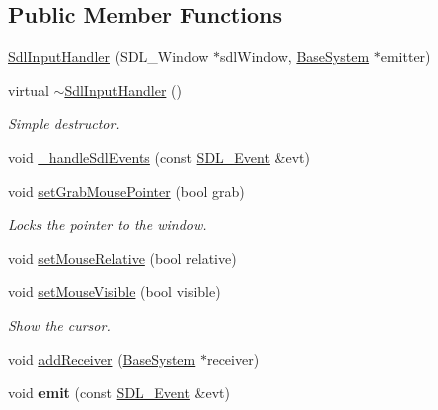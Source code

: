 \subsection*{Public Member Functions}
\begin{DoxyCompactItemize}
\item 
\hyperlink{class_common_1_1_sdl_input_handler_ac90801d445e5c31dcd2b965ca3eaef53}{Sdl\+Input\+Handler} (S\+D\+L\+\_\+\+Window $\ast$sdl\+Window, \hyperlink{class_common_1_1_base_system}{Base\+System} $\ast$emitter)
\item 
\mbox{\label{class_common_1_1_sdl_input_handler_aee86cff741e688efe72e66e947592fed}} 
virtual \hyperlink{class_common_1_1_sdl_input_handler_aee86cff741e688efe72e66e947592fed}{$\sim$\+Sdl\+Input\+Handler} ()
\begin{DoxyCompactList}\small\item\em Simple destructor. \end{DoxyCompactList}\item 
void \hyperlink{class_common_1_1_sdl_input_handler_a24ecda74ffbdad833809ec916ca5aa36}{\+\_\+handle\+Sdl\+Events} (const \hyperlink{union_s_d_l___event}{S\+D\+L\+\_\+\+Event} \&evt)
\item 
\mbox{\label{class_common_1_1_sdl_input_handler_af59f3d8f841492da0d58d70a7194d18a}} 
void \hyperlink{class_common_1_1_sdl_input_handler_af59f3d8f841492da0d58d70a7194d18a}{set\+Grab\+Mouse\+Pointer} (bool grab)
\begin{DoxyCompactList}\small\item\em Locks the pointer to the window. \end{DoxyCompactList}\item 
void \hyperlink{class_common_1_1_sdl_input_handler_a93f3c75fde51291eb985afbc1877dfb7}{set\+Mouse\+Relative} (bool relative)
\item 
\mbox{\label{class_common_1_1_sdl_input_handler_ac866cdab398f7fe1c2f77d186bb08d17}} 
void \hyperlink{class_common_1_1_sdl_input_handler_ac866cdab398f7fe1c2f77d186bb08d17}{set\+Mouse\+Visible} (bool visible)
\begin{DoxyCompactList}\small\item\em Show the cursor. \end{DoxyCompactList}\item 
void \hyperlink{class_common_1_1_sdl_input_handler_aa1a7c47e721048e1103db4038571f5c3}{add\+Receiver} (\hyperlink{class_common_1_1_base_system}{Base\+System} $\ast$receiver)
\item 
\mbox{\label{class_common_1_1_sdl_input_handler_ac906f60b05f1593089322cfdaeab72b3}} 
void {\bfseries emit} (const \hyperlink{union_s_d_l___event}{S\+D\+L\+\_\+\+Event} \&evt)
\end{DoxyCompactItemize}
